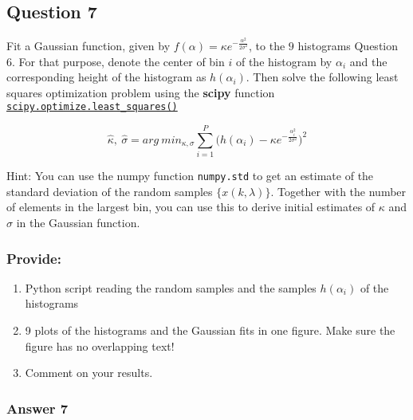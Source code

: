\documentclass[11pt]{article}
\providecommand{\tightlist}{%
      \setlength{\itemsep}{0pt}\setlength{\parskip}{0pt}}
\begin{document}
    \begin{center}
    \end{center}
    { \hspace*{\fill} \\}
    
    \hypertarget{question-7}{%
\subsection{Question 7}\label{question-7}}

Fit a Gaussian function, given by
\(f(\alpha) = \kappa e^{-\frac{\alpha^2}{2\sigma^2}}\), to the \(9\)
histograms Question 6. For that purpose, denote the center of bin \(i\)
of the histogram by \(\alpha _i\) and the corresponding height of the
histogram as \(h(\alpha_i)\). Then solve the following least squares
optimization problem using the \textbf{scipy} function
\href{https://docs.scipy.org/doc/scipy/reference/generated/scipy.optimize.least_squares.html}{\texttt{scipy.optimize.least\_squares()}}

\[ \hat{\kappa}, \ \hat{\sigma} = arg \ min_{\kappa,\sigma} \sum_{i=1}^P \Bigg( h(\alpha_i)-\kappa e^{-\frac{\alpha_i^2}{2\sigma^2}} \Bigg)^2 \]

Hint: You can use the numpy function \texttt{numpy.std} to get an
estimate of the standard deviation of the random samples
\(\{x(k,\lambda)\}\). Together with the number of elements in the
largest bin, you can use this to derive initial estimates of \(\kappa\)
and \(\sigma\) in the Gaussian function.

\hypertarget{provide}{%
\subsubsection{Provide:}\label{provide}}

\begin{enumerate}
\def\labelenumi{\arabic{enumi}.}
\tightlist
\item
  Python script reading the random samples and the samples
  \(h(\alpha _i)\) of the histograms
\item
  9 plots of the histograms and the Gaussian fits in one figure. Make
  sure the figure has no overlapping text!
\item
  Comment on your results.
\end{enumerate}

    \hypertarget{answer-7}{%
\subsubsection{Answer 7}\label{answer-7}}
\end{document}
